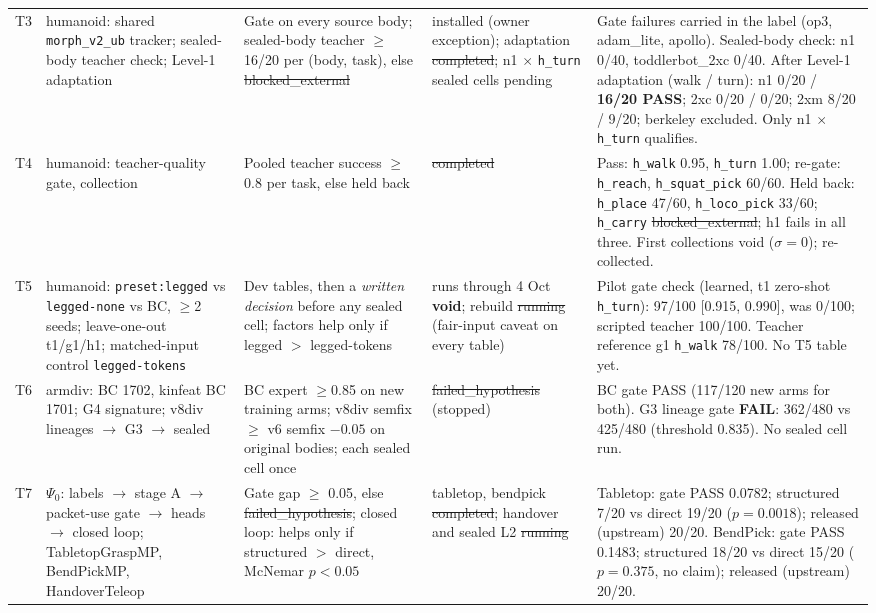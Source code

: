 \documentclass[10pt,twocolumn]{article}
\begin{document}
\begin{table}[t]
\begin{tabularx}{\textwidth}{@{}l>{\raggedright\arraybackslash}p{3.2cm}>{\raggedright\arraybackslash}p{4.1cm}>{\raggedright\arraybackslash}p{2.9cm}>{\raggedright\arraybackslash}X@{}}
\addlinespace
T3 & humanoid: shared \texttt{morph\_v2\_ub} tracker; sealed-body teacher check; Level-1 adaptation &
Gate on every source body; sealed-body teacher $\ge$16/20 per (body, task), else \st{blocked\_external} &
installed (owner exception); adaptation \st{completed}; n1 $\times$ \texttt{h\_turn} sealed cells pending &
Gate failures carried in the label (op3, adam\_lite, apollo). Sealed-body check: n1 0/40, toddlerbot\_2xc 0/40. After Level-1 adaptation (walk / turn): n1 0/20 / \textbf{16/20 PASS}; 2xc 0/20 / 0/20; 2xm 8/20 / 9/20; berkeley excluded. Only n1 $\times$ \texttt{h\_turn} qualifies. \\
\addlinespace
T4 & humanoid: teacher-quality gate, collection &
Pooled teacher success $\ge$0.8 per task, else held back &
\st{completed} &
Pass: \texttt{h\_walk} 0.95, \texttt{h\_turn} 1.00; re-gate: \texttt{h\_reach}, \texttt{h\_squat\_pick} 60/60. Held back: \texttt{h\_place} 47/60, \texttt{h\_loco\_pick} 33/60; \texttt{h\_carry} \st{blocked\_external}; h1 fails in all three. First collections void ($\sigma{=}0$); re-collected. \\
\addlinespace
T5 & humanoid: \texttt{preset:legged} vs \texttt{legged-none} vs BC, $\ge$2 seeds; leave-one-out t1/g1/h1; matched-input control \texttt{legged-tokens} &
Dev tables, then a \emph{written decision} before any sealed cell; factors help only if legged $>$ legged-tokens &
runs through 4 Oct \textbf{void}; rebuild \st{running} (fair-input caveat on every table) &
Pilot gate check (learned, t1 zero-shot \texttt{h\_turn}): 97/100 [0.915, 0.990], was 0/100; scripted teacher 100/100. Teacher reference g1 \texttt{h\_walk} 78/100. No T5 table yet. \\
\addlinespace
T6 & armdiv: BC 1702, kinfeat BC 1701; G4 signature; v8div lineages $\to$ G3 $\to$ sealed &
BC expert $\ge$0.85 on new training arms; v8div semfix $\ge$ v6 semfix $-0.05$ on original bodies; each sealed cell once &
\st{failed\_hypothesis} (stopped) &
BC gate PASS (117/120 new arms for both). G3 lineage gate \textbf{FAIL}: 362/480 vs 425/480 (threshold 0.835). No sealed cell run. \\
\addlinespace
T7 & $\Psi_0$: labels $\to$ stage A $\to$ packet-use gate $\to$ heads $\to$ closed loop; TabletopGraspMP, BendPickMP, HandoverTeleop &
Gate gap $\ge$ 0.05, else \st{failed\_hypothesis}; closed loop: helps only if structured $>$ direct, McNemar $p<0.05$ &
tabletop, bendpick \st{completed}; handover and sealed L2 \st{running} &
Tabletop: gate PASS 0.0782; structured 7/20 vs direct 19/20 ($p{=}0.0018$); released (upstream) 20/20. BendPick: gate PASS 0.1483; structured 18/20 vs direct 15/20 ($p{=}0.375$, no claim); released (upstream) 20/20. \\

\end{tabularx}
\end{table}
\end{document}
